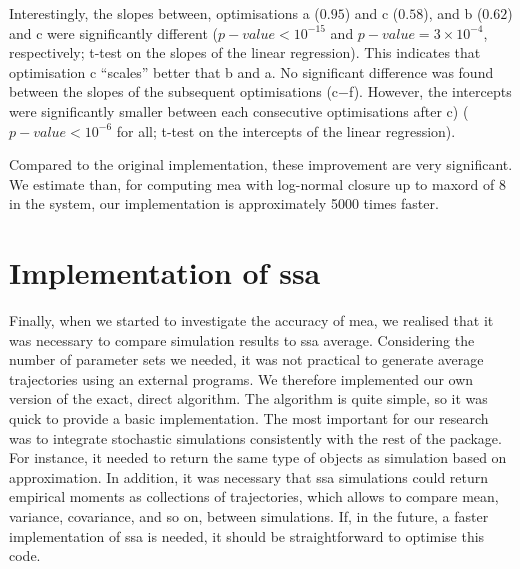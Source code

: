 Interestingly, the slopes between, optimisations a ($0.95$) and c ($0.58$), and b ($0.62$) and c were significantly different ($p-value <10^{-15}$ and $p-value = 3 \times 10^{-4}$, respectively;
t-test on the slopes of the linear regression). This indicates that optimisation c ``scales'' better that b and a.
No significant difference was found between the slopes of the subsequent optimisations (c$-$f).
However, the intercepts were significantly smaller between each consecutive optimisations after c) ($p-value < 10^{-6}$ for all; t-test on the intercepts of the linear regression).

Compared to the original \mat{} implementation, these improvement are very significant. We estimate than, for computing \gls{mea} with log-normal closure up to \gls{maxord}
of 8 in the \pft{} system, our implementation is approximately 5000 times faster.

\section{Implementation of \acrlong{ssa}}
Finally, when we started to investigate the accuracy of \gls{mea}, we realised that it was necessary to compare simulation results to \gls{ssa} average\cite{gillespie_general_1976}.
Considering the number of parameter sets we needed, it was not practical to generate average trajectories using an external programs.
We therefore implemented our own version of the exact, direct algorithm.
The algorithm is quite simple, so it was quick to provide a basic implementation.
The most important for our research was to integrate stochastic simulations consistently with the rest of the package.
For instance, it needed to return the same type of objects as simulation based on approximation.
In addition, it was necessary that \gls{ssa} simulations could return empirical moments as collections of trajectories,
which allows to compare mean, variance, covariance, and so on, between simulations.
If, in the future, a faster implementation of \gls{ssa} is needed, it should be straightforward to optimise this code.



